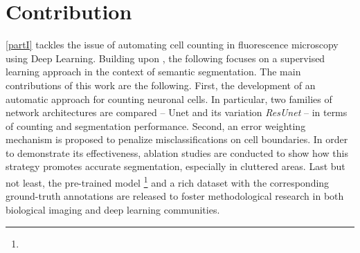 \section{Contribution}
\label{sec:contribution}
\cref{partI} tackles the issue of automating cell counting in fluorescence microscopy using Deep Learning. 
Building upon , the following focuses on a supervised learning approach in the context of semantic segmentation.
The main contributions of this work are the following. 
First, the development of an automatic approach for counting neuronal cells. 
In particular, two families of network architectures are compared -- {Unet} and its variation \textit{ResUnet} -- in terms of counting and segmentation performance. 
Second, an error weighting mechanism is proposed to penalize misclassifications on cell boundaries. In order to demonstrate its effectiveness, ablation studies are conducted to show how this strategy promotes accurate segmentation, especially in cluttered areas.
Last but not least, the pre-trained model%
\footnote{\linkmodel}
and a rich dataset with the corresponding ground-truth annotations \cite{clissa2021fluocells} are released to foster methodological research in both biological imaging and deep learning communities.